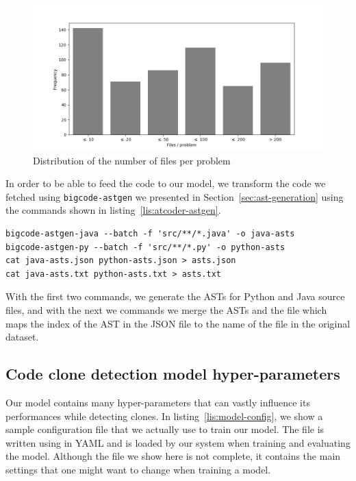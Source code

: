 \begin{figure}
  \begin{center}
    \includegraphics[width=16cm]{./images/code-clone-dataset-problems-distribution.png}
    \caption{\label{fig:files-per-problem-distribution} Distribution of the
      number of files per problem}
  \end{center}
\end{figure}

In order to be able to feed the code to our model, we transform the code we
fetched using \lstinline{bigcode-astgen} we presented in
Section~\ref{sec:ast-generation} using the commands shown in
listing~\ref{lis:atcoder-astgen}.

\begin{lstlisting}[numbers=none,language={},
  caption=AST generation using \lstinline{bigcode-astgen}, label=lis:atcoder-astgen]
bigcode-astgen-java --batch -f 'src/**/*.java' -o java-asts
bigcode-astgen-py --batch -f 'src/**/*.py' -o python-asts
cat java-asts.json python-asts.json > asts.json
cat java-asts.txt python-asts.txt > asts.txt
\end{lstlisting}
With the first two commands, we generate the ASTs for Python and Java source
files, and with the next we commands we merge the ASTs and the file which maps
the index of the AST in the JSON file to the name of the file in the original
dataset.
\subsection{\label{ssec:clone-detection-hyper-params}Code clone detection model hyper-parameters}
Our model contains many hyper-parameters that can vastly influence its
performances while detecting clones. In listing~\ref{lis:model-config}, we show a
sample configuration file that we actually use to train our model. The file is
written using in YAML and is loaded by our system when training and evaluating
the model. Although the file we show here is not complete, it contains the main
settings that one might want to change when training a model.

